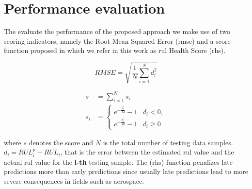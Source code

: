 \section{Performance evaluation}
\label{sec:rul_metrics}

The evaluate the performance of the proposed approach we make use of two scoring indicators, namely the Root Mean Squared Error (\gls{rmse}) and a score function proposed in \cite{Saxena2008} which we refer in this work as \gls{rul} Health Score (\gls{rhs}). 

\begin{equation}
RMSE = \sqrt{ \frac{1}{N} \sum_{i=1}^{N}{d_i^2}}
\end{equation}

\begin{align}
s &= \sum_{i=1}^{N}{s_i}\\
s_i &= \begin{cases} 
      e^{-\frac{d_i}{13}} - 1 & d_i < 0, \\
      e^{-\frac{d_i}{10}} - 1 & d_i \geq 0
\end{cases}
\end{align}

where $s$ denotes the score and $N$ is the total number of testing data samples. $d_i = RUL_i^p - RUL_i$, that is the error between the estimated \gls{rul} value and the actual \gls{rul} value for the \textbf{i-th} testing sample. The (\gls{rhs}) function penalizes late predictions more than early predictions since usually late predictions lead to more severe consequences in fields such as aerospace.

